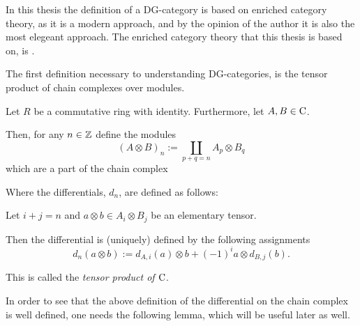 In this thesis the definition of a DG-category is based on enriched category theory, as it is a modern approach, and by the opinion of the author it is also the most elegeant approach. The enriched category theory that this thesis is based on, is \cite[Section 6.2]{Borceux_1994}.

The first definition necessary to understanding DG-categories, is the tensor product of chain complexes over modules.

\begin{definition}
    \label{def:tensor_product_of_chain_complexes_over_Mod(R)}
    Let \( R \) be a commutative ring with identity. Furthermore, let \( A, B \in \operatorname{C} \).

    Then, for any  \( n \in {\mathbb{Z}} \) define the modules
    \[
        (A \otimes B)_n := \coprod_{p + q = n} A_p \otimes B_q
    \]
    which are a part of the chain complex
    \begin{center}
    \end{center}

    Where the differentials, \( d_n \), are defined as follows:
    
    Let \( i + j = n \) and \( a \otimes b \in A_i \otimes B_j \) be an elementary tensor.

    Then the differential is (uniquely) defined by the following assignments
    \[
        d_n(a \otimes b) := d_{A, i}(a) \otimes b + (-1)^{i} a \otimes d_{B, j}(b).
    \]

    This is called the \emph{tensor product of \( \operatorname{C} \)}.
\end{definition}

In order to see that the above definition of the differential on the chain complex is well defined, one needs the following lemma, which will be useful later as well.

